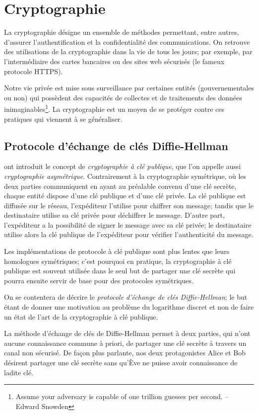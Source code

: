 \documentclass[a4paper,12pt]{article}
\theoremstyle{definition}
\theoremstyle{remark}
\numberwithin{equation}{section}
\begin{document}
\section{Cryptographie}

La cryptographie désigne un ensemble de méthodes permettant, entre autres, d'assurer l'authentification et la confidentialité des communications. On retrouve des utilisations de la cryptographie dans la vie de tous les jours; par exemple, par l'intermédiaire des cartes bancaires ou des sites web sécurisés (le fameux protocole HTTPS).

Notre vie privée est mise sous surveillance par certaines entités (gouvernementales ou non) qui possèdent des capacités de collectes et de traitements des données inimaginables\footnote{Assume your adversary is capable of one trillion guesses per second. -- Edward Snowden}.
La cryptographie est un moyen de se protéger contre ces pratiques qui viennent à se généraliser.

\subsection{Protocole d'échange de clés Diffie-Hellman}
\cite{diffie-hellman} ont introduit le concept de \emph{cryptographie à clé publique}, que l'on appelle aussi \emph{cryptographie asymétrique}. Contrairement à la cryptographie symétrique, où les deux parties communiquent en ayant au préalable convenu d'une clé secrète, chaque entité dispose d'une clé publique et d'une clé privée. La clé publique est diffusée sur le réseau, l'expéditeur l'utilise pour chiffrer son message; tandis que le destinataire utilise sa clé privée pour déchiffrer le message. D'autre part, l'expéditeur a la possibilité de signer le message avec sa clé privée; le destinataire utilise alors la clé publique de l'expéditeur pour vérifier l'authenticité du message.

Les implémentations de protocole à clé publique sont plus lentes que leurs homologues symétriques; c'est pourquoi en pratique, la cryptographie à clé publique est souvent utilisée dans le seul but de partager une clé secrète qui pourra ensuite servir de base pour des protocoles symétriques.

On se contentera de décrire le \emph{protocole d'échange de clés Diffie-Hellman}; le but étant de donner une motivation au problème du logarithme discret et non de faire un état de l'art de la cryptographie à clé publique.

La méthode d'échange de clés de Diffie-Hellman permet à deux parties, qui n'ont aucune connaissance commune à priori, de partager une clé secrète à travers un canal non sécurisé. De façon plus parlante, nos deux protagonistes Alice et Bob désirent partager une clé secrète sans qu'Ève ne puisse avoir connaissance de ladite clé.
\end{document}
